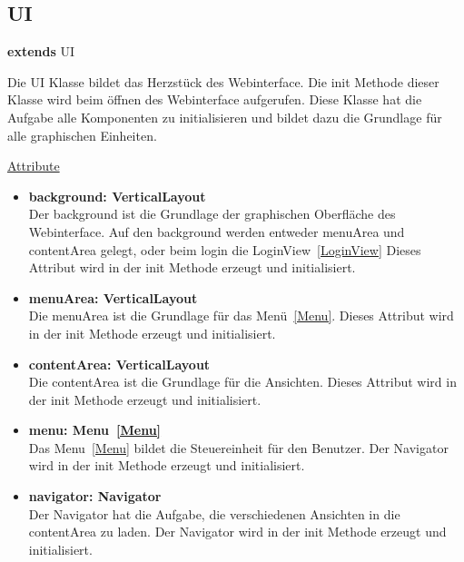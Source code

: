 \newpage
\subsection{UI}\label{UI}
\textbf{extends}  UI \newline

Die UI Klasse bildet das Herzstück des Webinterface. Die init Methode dieser Klasse wird beim öffnen des Webinterface aufgerufen. Diese Klasse hat die Aufgabe alle Komponenten zu initialisieren und bildet dazu die Grundlage für alle graphischen Einheiten.
\newline

\underline{Attribute}
\begin{itemize}
\itemsep0pt

\item \textbf{background: VerticalLayout} \hfill\\ 
Der background ist die Grundlage der graphischen Oberfläche des Webinterface. Auf den background werden entweder menuArea und contentArea gelegt, oder beim login die LoginView~\eqref{LoginView} Dieses Attribut wird in der init Methode erzeugt und initialisiert.

\item \textbf{menuArea: VerticalLayout} \hfill\\ 
Die menuArea ist die Grundlage für das Menü~\eqref{Menu}. Dieses Attribut wird in der init Methode erzeugt und initialisiert.

\item \textbf{contentArea: VerticalLayout} \hfill\\ 
Die contentArea ist die Grundlage für die Ansichten. Dieses Attribut wird in der init Methode erzeugt und initialisiert.

\item \textbf{menu: Menu~\eqref{Menu}} \hfill\\ 
Das Menu~\eqref{Menu} bildet die Steuereinheit für den Benutzer. Der Navigator wird in der init Methode erzeugt und initialisiert.

\item \textbf{navigator: Navigator} \hfill\\ 
Der Navigator hat die Aufgabe, die verschiedenen Ansichten in die contentArea zu laden. Der Navigator wird in der init Methode erzeugt und initialisiert.

\end{itemize}

